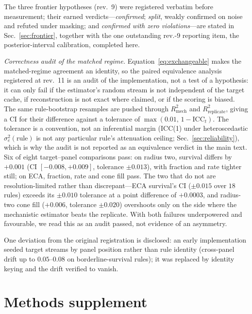 \documentclass[aip,cha,amsmath,amssymb,reprint,floatfix]{revtex4-2}
\begin{document}
The three frontier hypotheses (rev.~9) were registered verbatim before
measurement; their earned verdicts---\emph{confirmed}; \emph{split}, weakly
confirmed on noise and refuted under masking; and \emph{confirmed with zero
violations}---are stated in Sec.~\ref{sec:frontier}, together with the one
outstanding rev.-9 reporting item, the posterior-interval calibration,
completed here.

\emph{Correctness audit of the matched regime.} Equation~\eqref{eq:exchangeable}
makes the matched-regime agreement an identity, so the paired equivalence
analysis registered at rev.~11 is an audit of the implementation, not a test
of a hypothesis: it can only fail if the estimator's random stream is not
independent of the target cache, if reconstruction is not exact where claimed,
or if the scoring is biased. The same rule-bootstrap resamples are pushed
through $R^2_{\mathrm{mech}}$ and $R^2_{\mathrm{replicate}}$, giving a CI for
their difference against a tolerance of $\max(0.01,\,1-\mathrm{ICC}_t)$. The
tolerance is a convention, not an inferential margin (ICC(1) under
heteroscedastic $\sigma_e^2(\text{rule})$ is not any particular rule's
attenuation ceiling; Sec.~\ref{sec:reliability}), which is why the audit is
not reported as an equivalence verdict in the main text. Six of eight target--panel comparisons pass: on
radius two, survival differs by $+0.001$ (CI $[-0.008,+0.009]$, tolerance
$\pm0.013$), with fraction and rate tighter still; on ECA, fraction, rate and
cone fill pass. The two that do not are resolution-limited rather than
discrepant---ECA survival's CI ($\pm0.015$ over $18$ rules) exceeds its
$\pm0.010$ tolerance at a point difference of $+0.0003$, and radius-two cone
fill ($+0.006$, tolerance $\pm0.020$) overshoots only on the side where the
mechanistic estimator beats the replicate. With both failures underpowered
and favourable, we read this as an audit passed, not evidence of an
asymmetry.

One deviation from the original registration is
disclosed: an early implementation seeded target streams by panel position
rather than rule identity (cross-panel drift up to $0.05$--$0.08$ on
borderline-survival rules); it was replaced by identity keying and the drift
verified to vanish.

\section{Methods supplement}
\label{app:methods}
\end{document}
